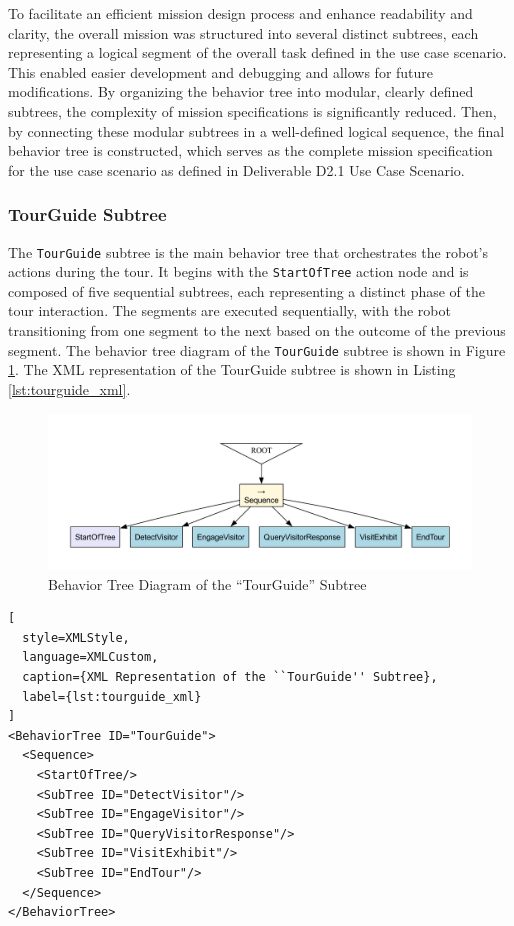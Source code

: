 \documentclass{CSSRforAfrica}
\begin{document}
To facilitate an efficient mission design process and enhance readability and clarity, the overall mission was structured into several distinct subtrees, each representing a logical segment of the overall task defined in the use case scenario. 
This enabled easier development and debugging and allows for future modifications. By organizing the behavior tree into modular, clearly defined subtrees, the complexity of mission specifications is significantly reduced. Then, by connecting these modular subtrees in a well-defined logical sequence, the final behavior tree is constructed, which serves as the complete mission specification for the use case scenario as defined in Deliverable D2.1 Use Case Scenario.
  
\vspace{-1mm}
\subsubsection{TourGuide Subtree}
\vspace{-2mm}
The \texttt{TourGuide} subtree is the main behavior tree that orchestrates the robot's actions during the tour. It begins with the \texttt{StartOfTree} action node and is composed of five sequential subtrees, each representing a distinct phase of the tour interaction. The segments are executed sequentially, with the robot transitioning from one segment to the next based on the outcome of the previous segment.  The behavior tree diagram of the \texttt{TourGuide} subtree is shown in Figure \ref{fig:tourguide_diagram}. The XML representation of the TourGuide subtree is shown in Listing \ref{lst:tourguide_xml}.

\begin{figure}[H]
  \centering
  \includegraphics[width=\textwidth]{./diagrams/main.pdf}
  \caption{Behavior Tree Diagram of the ``TourGuide'' Subtree}
  \label{fig:tourguide_diagram}
\end{figure}

\begin{lstlisting}[
  style=XMLStyle, 
  language=XMLCustom, 
  caption={XML Representation of the ``TourGuide'' Subtree},
  label={lst:tourguide_xml}
]
<BehaviorTree ID="TourGuide">
  <Sequence>
    <StartOfTree/>
    <SubTree ID="DetectVisitor"/>
    <SubTree ID="EngageVisitor"/>
    <SubTree ID="QueryVisitorResponse"/>
    <SubTree ID="VisitExhibit"/>
    <SubTree ID="EndTour"/>
  </Sequence>
</BehaviorTree>
\end{lstlisting}
\end{document}
